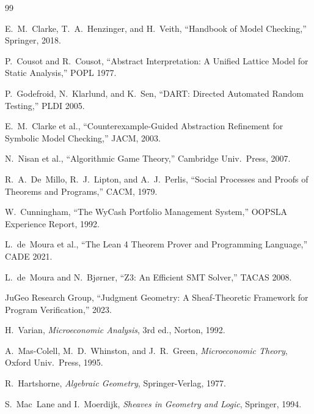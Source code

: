 \documentclass[11pt]{article}
\begin{document}
\begin{thebibliography}{99}

E.~M.~Clarke, T.~A.~Henzinger, and H.~Veith, ``Handbook of Model
Checking,'' Springer, 2018.

P.~Cousot and R.~Cousot, ``Abstract Interpretation: A Unified Lattice
Model for Static Analysis,'' POPL 1977.

P.~Godefroid, N.~Klarlund, and K.~Sen, ``DART: Directed Automated
Random Testing,'' PLDI 2005.

E.~M.~Clarke et al., ``Counterexample-Guided Abstraction Refinement
for Symbolic Model Checking,'' JACM, 2003.

N.~Nisan et al., ``Algorithmic Game Theory,'' Cambridge Univ.\ Press,
2007.

R.~A.~De~Millo, R.~J.~Lipton, and A.~J.~Perlis, ``Social Processes
and Proofs of Theorems and Programs,'' CACM, 1979.

W.~Cunningham, ``The WyCash Portfolio Management System,'' OOPSLA
Experience Report, 1992.

L.~de~Moura et al., ``The Lean 4 Theorem Prover and Programming Language,''
CADE 2021.

L.~de~Moura and N.~Bjørner, ``Z3: An Efficient SMT Solver,'' TACAS 2008.

JuGeo Research Group, ``Judgment Geometry: A Sheaf-Theoretic Framework for
Program Verification,'' 2023.

H.~Varian, \emph{Microeconomic Analysis}, 3rd ed., Norton, 1992.

A.~Mas-Colell, M.~D.~Whinston, and J.~R.~Green,
\emph{Microeconomic Theory}, Oxford Univ.\ Press, 1995.

R.~Hartshorne, \emph{Algebraic Geometry}, Springer-Verlag, 1977.

S.~Mac~Lane and I.~Moerdijk, \emph{Sheaves in Geometry and Logic},
Springer, 1994.

\end{thebibliography}
\end{document}
